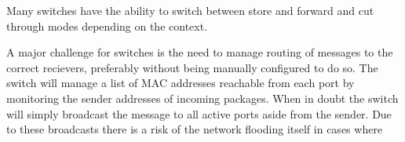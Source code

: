 \noindent Many switches have the ability to switch between store and forward and cut through modes depending on the context.

\noindent A major challenge for switches is the need to manage routing of messages to the correct recievers, preferably without being manually configured to do so. The switch will manage a list of MAC addresses reachable from each port by monitoring the sender addresses of incoming packages. When in doubt the switch will simply broadcast the message to all active ports aside from the sender. Due to these broadcasts there is a risk of the network flooding itself in cases where 


